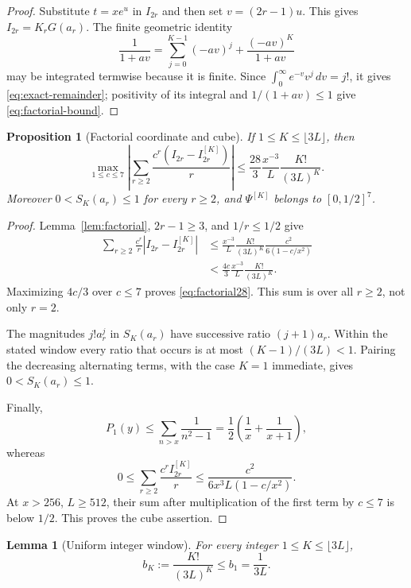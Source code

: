 \documentclass[11pt]{article}
\newtheorem{proposition}[theorem]{Proposition}
\newtheorem{lemma}[theorem]{Lemma}
\theoremstyle{definition}
\theoremstyle{remark}
\newcommand{\PsiK}{\Psi^{[K]}}
\begin{document}
\begin{proof}
Substitute $t=xe^u$ in $I_{2r}$ and then set
$v=(2r-1)u$.  This gives $I_{2r}=K_rG(a_r)$.  The finite geometric
identity
\[
 \frac1{1+av}=\sum_{j=0}^{K-1}(-av)^j
 +\frac{(-av)^K}{1+av}
\]
may be integrated termwise because it is finite.  Since
$\int_0^\infty e^{-v}v^j\,dv=j!$, it gives
\eqref{eq:exact-remainder}; positivity of its integral and
$1/(1+av)\le1$ give \eqref{eq:factorial-bound}.
\end{proof}

\begin{proposition}[Factorial coordinate and cube]
\label{prop:factorial-coordinate}
If $1\le K\le\lfloor3L\rfloor$, then
\begin{equation}
 \max_{1\le c\le7}
 \left|\sum_{r\ge2}\frac{c^r(I_{2r}-I_{2r}^{[K]})}r\right|
 \le\frac{28}{3}\frac{x^{-3}}L\frac{K!}{(3L)^K}.
 \label{eq:factorial28}
\end{equation}
Moreover $0<S_K(a_r)\le1$ for every $r\ge2$, and $\PsiK$ belongs to
$[0,1/2]^7$.
\end{proposition}

\begin{proof}
Lemma~\ref{lem:factorial}, $2r-1\ge3$, and $1/r\le1/2$ give
\begin{align*}
 \sum_{r\ge2}\frac{c^r}{r}|I_{2r}-I_{2r}^{[K]}|
 &\le \frac{x^{-3}}L\frac{K!}{(3L)^K}
 \frac{c^2}{6(1-c/x^2)}\\
 &<\frac{4c}{3}\frac{x^{-3}}L\frac{K!}{(3L)^K}.
\end{align*}
Maximizing $4c/3$ over $c\le7$ proves \eqref{eq:factorial28}.  This
sum is over all $r\ge2$, not only $r=2$.

The magnitudes $j!a_r^j$ in $S_K(a_r)$ have successive ratio
$(j+1)a_r$.  Within the stated window every ratio that occurs is at most
$(K-1)/(3L)<1$.  Pairing the decreasing alternating terms, with the
case $K=1$ immediate, gives $0<S_K(a_r)\le1$.

Finally,
\[
 P_1(y)\le\sum_{n>x}\frac1{n^2-1}
 =\frac12\left(\frac1x+\frac1{x+1}\right),
\]
whereas
\[
 0\le\sum_{r\ge2}\frac{c^rI_{2r}^{[K]}}r
 \le\frac{c^2}{6x^3L(1-c/x^2)}.
\]
At $x>256$, $L\ge512$, their sum after multiplication of the first term
by $c\le7$ is below $1/2$.  This proves the cube assertion.
\end{proof}

\begin{lemma}[Uniform integer window]
\label{lem:window}
For every integer $1\le K\le\lfloor3L\rfloor$,
\begin{equation}
 b_K:=\frac{K!}{(3L)^K}\le b_1=\frac1{3L}.
 \label{eq:bK}
\end{equation}
\end{lemma}
\end{document}
